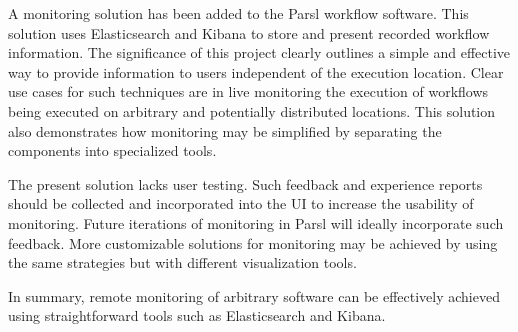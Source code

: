 A monitoring solution has been added to the Parsl workflow software.
This solution uses Elasticsearch and Kibana to store and present recorded workflow information.
The significance of this project clearly outlines a simple and effective way to provide information to users independent of the execution location.
Clear use cases for such techniques are in live monitoring the execution of workflows being executed on arbitrary and potentially distributed locations.
This solution also demonstrates how monitoring may be simplified by separating the components into specialized tools.

The present solution lacks user testing.
Such feedback and experience reports should be collected and incorporated into the UI to increase the usability of monitoring.
Future iterations of monitoring in Parsl will ideally incorporate such feedback.
More customizable solutions for monitoring may be achieved by using the same strategies but with different visualization tools.

In summary, remote monitoring of arbitrary software can be effectively achieved using straightforward tools such as Elasticsearch and Kibana.
